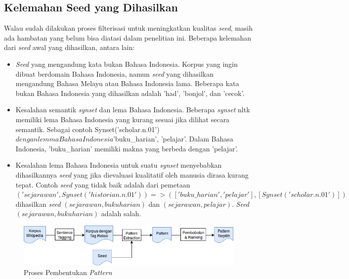 \subsection{Kelemahan Seed yang Dihasilkan}
Walau sudah dilakukan proses filterisasi untuk meningkatkan kualitas \textit{seed}, masih ada hambatan yang belum bisa diatasi dalam penelitian ini. Beberapa kelemahan dari \textit{seed} awal yang dihasilkan, antara lain:
\begin{itemize}
  \item \textit{Seed} yang mengandung kata bukan Bahasa Indonesia. Korpus yang ingin dibuat berdomain Bahasa Indonesia, namun \textit{seed} yang dihasilkan mengandung Bahasa Melayu atau Bahasa Indonesia lama. Beberapa kata bukan Bahasa Indonesia yang dihasilkan adalah 'had', 'bonjol', dan 'cecok'.
  \item Kesalahan semantik \textit{synset} dan lema Bahasa Indonesia. Beberapa \textit{synset} nltk memiliki lema Bahasa Indonesia yang kurang sesuai jika dilihat secara semantik. Sebagai contoh Synset('scholar.n.01')$ dengan lemma Bahasa Indonesia ${'buku\_harian', 'pelajar'}. Dalam Bahasa Indonesia, 'buku\_harian' memiliki makna yang berbeda dengan 'pelajar'.
  \item Kesalahan lema Bahasa Indonesia untuk suatu \textit{synset} menyebabkan dihasilkannya \textit{seed} yang jika dievaluasi kualitatif oleh manusia dirasa kurang tepat. Contoh \textit{seed} yang tidak baik adalah dari pemetaan $('sejarawan', Synset('historian.n.01')) => (['buku\_harian', 'pelajar'], [Synset('scholar.n.01')])$ dihasilkan \textit{seed} $(sejarawan,buku harian)$ dan $(sejarawan,pelajar)$. \textit{Seed} $(sejarawan,buku harian)$ adalah salah.
\end{itemize}


\begin{figure}
    \centering
    \includegraphics[width=\linewidth]{pics/Pic03-PatternExtraction}
    \caption{Proses Pembentukan \textit{Pattern}}
    \label{fig:pattern-extraction}
\end{figure}
